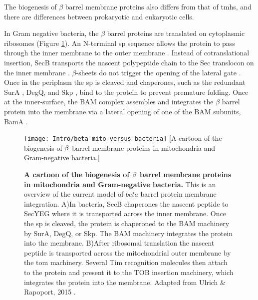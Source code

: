The biogenesis of $\beta$ barrel membrane proteins also differs from that of \gls{tmh}s, and there are differences between prokaryotic and eukaryotic cells.

In Gram negative bacteria, the $\beta$ barrel proteins are translated on cytoplasmic ribosomes (Figure \ref{fig:beta-mito-versus-bacteria}).
An N-terminal \gls{sp} sequence allows the protein to pass through the inner membrane to the outer membrane \cite{Driessen2008, Papanikou2007}.
Instead of cotranslational insertion, SecB transports the nascent polypeptide chain to the Sec translocon on the inner membrane \cite{Bechtluft2010}.
$\beta$\--sheets do not trigger the opening of the lateral gate \cite{Ulrich2015}.
Once in the periplasm the \gls{sp} is cleaved \cite{Paetzel2014} and chaperones, such as the redundant SurA \cite{Lazar1996, Volokhina2011}, DegQ, and Skp \cite{Volokhina2011}, bind to the protein to prevent premature folding.
Once at the inner-surface, the BAM complex assembles and integrates the $\beta$ barrel protein into the membrane \cite{Wu2005, Hagan2011} via a lateral opening of one of the BAM subunits, BamA \cite{Noinaj2014}.

\begin{figure}[ht]
\centering
\texttt{[image: Intro/beta-mito-versus-bacteria]}
		[A cartoon of the biogenesis of $\protect\beta$ barrel membrane proteins in mitochondria and Gram\--negative bacteria.]{\textbf{A cartoon of the biogenesis of $\protect\beta$ barrel membrane proteins in mitochondria and Gram\--negative bacteria.}
		This is an overview of the current model of $beta$ barrel protein membrane integration.
		A)In bacteria, SecB chaperones the nascent peptide to SecYEG where it is transported across the inner membrane.
		Once the \gls{sp} is cleaved, the protein is chaperoned to the BAM machinery by SurA, DegQ, or Skp.
		The BAM machinery integrates the protein into the membrane.
		B)After ribosomal translation the nascent peptide is transported across the mitochondrial outer membrane by the \gls{tom} machinery.
		Several Tim recognition molecules then attach to the protein and present it to the TOB insertion machinery, which integrates the protein into the membrane.
		Adapted from Ulrich \& Rapoport, 2015 \cite{Ulrich2015}.

		}
\label{fig:beta-mito-versus-bacteria}
\end{figure}

